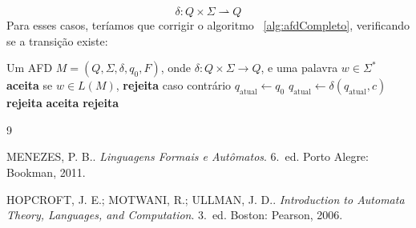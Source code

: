\documentclass[12pt, a4paper]{article}
\theoremstyle{definition}
\theoremstyle{plain}
\theoremstyle{remark}
\begin{document}
\[
\delta : Q \times \Sigma \rightharpoonup Q
\]
Para esses casos, teríamos que corrigir o algoritmo ~\ref{alg:afdCompleto}, verificando se a transição existe:
\begin{algorithm}[H]
  \caption{Simulação de um AFD com $\delta(\cdot, \cdot)$ parcial}
  \label{alg:afdCompleto}
  \begin{algorithmic}[1]
    \Require Um AFD $M = (Q, \Sigma, \delta, q_0, F)$,
             onde $\delta : Q \times \Sigma \to Q$,
             e uma palavra $w \in \Sigma^*$
    \Ensure  \textbf{aceita} se $w \in L(M)$, \textbf{rejeita} caso contrário
    \State $q_{\text{atual}} \gets q_0$
        \State $q_{\text{atual}} \gets \delta(q_{\text{atual}}, c)$
      \Else
        \State \Return \textbf{rejeita}
      \EndIf
    \EndFor
      \State \Return \textbf{aceita}
    \Else
      \State \Return \textbf{rejeita}
    \EndIf
  \end{algorithmic}
\end{algorithm}

\newpage
\begin{thebibliography}{9}

MENEZES, P. B.\@.
\textit{Linguagens Formais e Autômatos}.
6.~ed. Porto Alegre: Bookman, 2011.

HOPCROFT, J. E.; MOTWANI, R.; ULLMAN, J. D.\@.
\textit{Introduction to Automata Theory, Languages, and Computation}.
3.~ed. Boston: Pearson, 2006.

\end{thebibliography}
\end{document}
